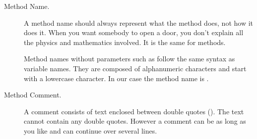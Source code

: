 {{{

\begin{description}
\item[Method Name.] 
A method name should always represent what the method does\newcommand{\replace}[2]{ 
and}{,} not how it does it.  When you want \newcommand{\remove}[1]{to} somebody to open a door, 
you \newcommand{\replace}[2]{do not}{don't} explain \newcommand{\remove}[1]{him} all the \newcommand{\replace}[2]{physic}{physics} and mathematics involved. \newcommand{\replace}[2]{This}{It} is the 
same for \newcommand{\replace}[2]{method}{methods}. 

Method names without parameters such as 
 follow the same syntax as variable names. They are 
composed of \newcommand{\replace}[2]{alphanumerical}{alphanumeric} characters \newcommand{\add}[1]{(letters and digits),} and start with a
lowercase character. In our case the method name is .
\item[Method Comment.]
\newcommand{\replace}[2]{It}{A comment} consists of \newcommand{\remove}[1]{a} text enclosed \newcommand{\replace}[2]{within a pair of}{between} double quotes
(). \newcommand{\replace}[2]{That}{The} text cannot contain any double quotes. However\newcommand{\remove}[1]{,} a
comment can be as long as you like\newcommand{\add}[1]{,} and can \newcommand{\replace}[2]{span itself}{continue}
over several lines. \newcommand{\add}[1]{\paragraph
''
In general a comment explains the purpose and the 
effect of the method. It explains how the method can be used\newcommand{\replace}[2]{ and}{,} not how 
the method \newcommand{\replace}[2]{is working}{does its job}. \newcommand{\replace}[2]{People}{Anyone} who wants to know how the method \newcommand{\replace}[2]{is defined should}{works can} read the method's body.

If the method name is \newcommand{\replace}[2]{explicit}{clear} enough, the comment may be omitted.  
In our case the method comment is:
\begin{nalltt}
   "Draw a square \newcommand{\replace}[2]{of 100 pixel size}{100 pixels wide}"
\end{nalltt}

\item[Method Body.] After the comment comes the method definition itself
\ie the sequence of messages that are executed in response to a message. In our case the 
method body is: 
\


}
\end{description}}}}
